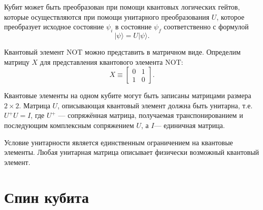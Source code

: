 \documentclass[14pt,a4paper]{PhDthesis}
\begin{document}
Кубит может быть преобразован при помощи квантовых логических гейтов, которые осуществляются при помощи унитарного преобразования $U$, которое преобразует исходное состояние $\psi_{i}$ в состояние $\psi_{f}$ соответственно с формулой
\begin{equation}
|\psi\rangle = U|\psi\rangle.
\end{equation}

Квантовый элемент $\mathrm{NOT}$ можно представить в матричном виде. Определим матрицу $X$ для представления квантового элемента $\mathrm{NOT}$:
\begin{equation}
X \equiv \begin{bmatrix} 0 & 1 \\ 1 & 0 \end{bmatrix}.
\end{equation}

Квантовые элементы на одном кубите могут быть записаны матрицами размера $2 \times 2$. Матрица $U$, описывающая квантовый элемент должна быть унитарна, т.е. $U^{+}U = I$, где $U^{+}$ --- сопряжённая матрица, получаемая транспонированием и последующим комплексным сопряжением $U$, а $I$--- единичная матрица. 

Условие унитарности является единственным ограничением на квантовые элементы. Любая унитарная матрица описывает физически возможный квантовый элемент. 


\section{Спин кубита}
\end{document}
